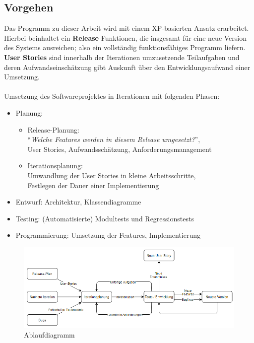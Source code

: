 \documentclass[11pt]{article}
\begin{document}
    \subsection{Vorgehen}
    Das Programm zu dieser Arbeit wird mit einem XP-basierten Ansatz erarbeitet.
    Hierbei beinhaltet ein \textbf{Release} Funktionen, die insgesamt für eine neue Version des Systems ausreichen;
    also ein vollständig funktionsfähiges Programm liefern.
    \textbf{User Stories} sind innerhalb der Iterationen umzusetzende Teilaufgaben und deren Aufwandseinschätzung gibt
    Auskunft über den Entwicklungsaufwand einer Umsetzung.\\~\\
    Umsetzung des Softwareprojektes in Iterationen mit folgenden Phasen:
    \begin{itemize}
        \item Planung:
        \begin{itemize}
            \item Release-Planung:\\"`\textit{Welche Features werden in diesem Release umgesetzt?}"',\\User Stories,
            Aufwandsschätzung, Anforderungsmanagement
            \item Iterationsplanung:\\Umwandlung der User Stories in kleine Arbeitsschritte,\\Festlegen der Dauer einer
            Implementierung
        \end{itemize}
        \item Entwurf: Architektur, Klassendiagramme
        \item Testing: (Automatisierte) Modultests und Regressionstests
        \item Programmierung: Umsetzung der Features, Implementierung
    \end{itemize}
    \begin{figure}[H]
        \centering
        \includegraphics[width=15cm]{../images/extreme_programming.PNG}
        \caption{Ablaufdiagramm}
    \end{figure}
\end{document}
